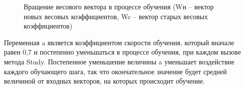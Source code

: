 \documentclass[14pt,a4paper]{extreport}
\begin{document}
  \begin{figure}[h!]
\caption{Вращение весового вектора в процессе обучения
(Wн – вектор новых весовых коэффициентов, Wc – вектор старых весовых коэффициентов)}
\end{figure}
 
  \hspace {4ex} Переменная a является коэффициентом скорости обучения, который вначале  равен 0,7 и постепенно уменьшаться в процессе обучения, при каждом вызове метода Study. Постепенное уменьшение величины a уменьшает воздействие каждого обучающего шага, так что окончательное значение будет средней величиной от входных векторов, на которых происходит обучение.\ 
    
\end{document}
